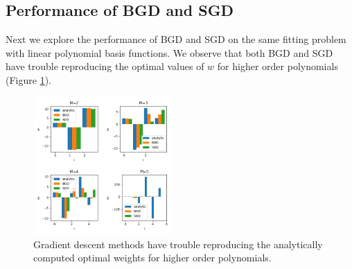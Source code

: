 \documentclass[10pt, twocolumn]{article}
\begin{document}


\subsection{Performance of BGD and SGD}

Next we explore the performance of BGD and SGD on the same fitting problem with linear polynomial basis functions. We observe that both BGD and SGD have trouble reproducing the optimal values of $w$ for higher order polynomials (Figure \ref{fig:gd_weights}). 

\begin{figure}
\caption{Gradient descent methods have trouble reproducing the analytically computed optimal weights for higher order polynomials.}
\begin{center}
\includegraphics[width=200px]{all_weights}
\end{center}
\label{fig:gd_weights}
\end{figure}
\end{document}

